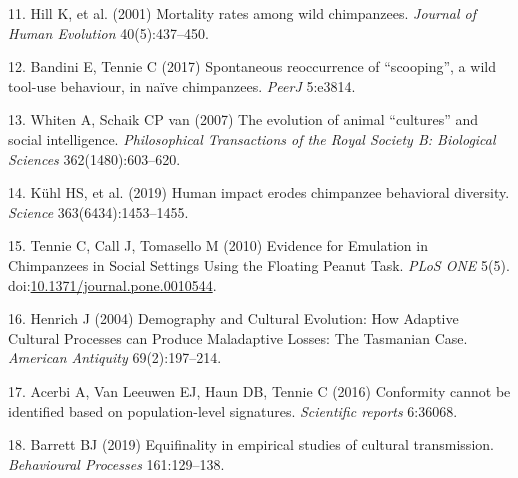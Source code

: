 \documentclass[9pt,twocolumn,twoside,]{pnas-new}
\begin{document}
\hypertarget{ref-hill_mortality_2001}{}
11. Hill K, et al. (2001) Mortality rates among wild chimpanzees.
\emph{Journal of Human Evolution} 40(5):437--450.

\hypertarget{ref-bandini_spontaneous_2017}{}
12. Bandini E, Tennie C (2017) Spontaneous reoccurrence of ``scooping'',
a wild tool-use behaviour, in naïve chimpanzees. \emph{PeerJ} 5:e3814.

\hypertarget{ref-whiten_evolution_2007}{}
13. Whiten A, Schaik CP van (2007) The evolution of animal ``cultures''
and social intelligence. \emph{Philosophical Transactions of the Royal
Society B: Biological Sciences} 362(1480):603--620.

\hypertarget{ref-kuhl_human_2019}{}
14. Kühl HS, et al. (2019) Human impact erodes chimpanzee behavioral
diversity. \emph{Science} 363(6434):1453--1455.

\hypertarget{ref-tennie_evidence_2010}{}
15. Tennie C, Call J, Tomasello M (2010) Evidence for Emulation in
Chimpanzees in Social Settings Using the Floating Peanut Task.
\emph{PLoS ONE} 5(5).
doi:\href{https://doi.org/10.1371/journal.pone.0010544}{10.1371/journal.pone.0010544}.

\hypertarget{ref-henrich_demography_2004}{}
16. Henrich J (2004) Demography and Cultural Evolution: How Adaptive
Cultural Processes can Produce Maladaptive Losses: The Tasmanian Case.
\emph{American Antiquity} 69(2):197--214.

\hypertarget{ref-acerbi_conformity_2016}{}
17. Acerbi A, Van Leeuwen EJ, Haun DB, Tennie C (2016) Conformity cannot
be identified based on population-level signatures. \emph{Scientific
reports} 6:36068.

\hypertarget{ref-barrett_equifinality_2019}{}
18. Barrett BJ (2019) Equifinality in empirical studies of cultural
transmission. \emph{Behavioural Processes} 161:129--138.



% 
\end{document}
